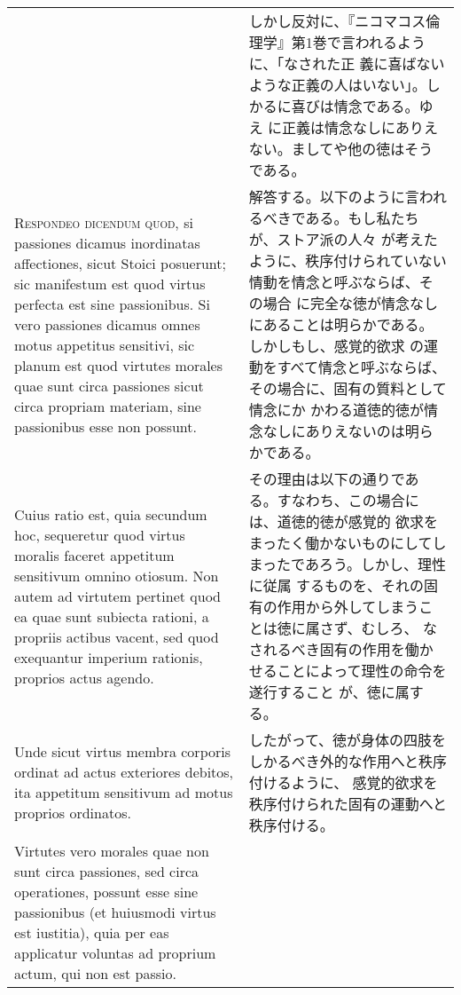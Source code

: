 \documentclass[10pt]{jsarticle}
\begin{document}
\begin{longtable}{p{21em}p{21em}}
&

 しかし反対に、『ニコマコス倫理学』第1巻で言われるように、「なされた正
 義に喜ばないような正義の人はいない」。しかるに喜びは情念である。ゆえ
 に正義は情念なしにありえない。ましてや他の徳はそうである。
 
\\




 {\scshape Respondeo dicendum quod}, si passiones dicamus inordinatas
 affectiones, sicut Stoici posuerunt; sic manifestum est quod virtus
 perfecta est sine passionibus. Si vero passiones dicamus omnes motus
 appetitus sensitivi, sic planum est quod virtutes morales quae sunt
 circa passiones sicut circa propriam materiam, sine passionibus esse
 non possunt.
 
&

 解答する。以下のように言われるべきである。もし私たちが、ストア派の人々
 が考えたように、秩序付けられていない情動を情念と呼ぶならば、その場合
 に完全な徳が情念なしにあることは明らかである。しかしもし、感覚的欲求
 の運動をすべて情念と呼ぶならば、その場合に、固有の質料として情念にか
 かわる道徳的徳が情念なしにありえないのは明らかである。
 
\\


 Cuius ratio est, quia secundum hoc, sequeretur quod virtus moralis
 faceret appetitum sensitivum omnino otiosum. Non autem ad virtutem
 pertinet quod ea quae sunt subiecta rationi, a propriis actibus
 vacent, sed quod exequantur imperium rationis, proprios actus agendo.
 
&

 その理由は以下の通りである。すなわち、この場合には、道徳的徳が感覚的
 欲求をまったく働かないものにしてしまったであろう。しかし、理性に従属
 するものを、それの固有の作用から外してしまうことは徳に属さず、むしろ、
 なされるべき固有の作用を働かせることによって理性の命令を遂行すること
 が、徳に属する。
 
\\


 Unde sicut virtus membra corporis ordinat ad actus exteriores
 debitos, ita appetitum sensitivum ad motus proprios
 ordinatos.

 &
 
 したがって、徳が身体の四肢をしかるべき外的な作用へと秩序付けるように、
 感覚的欲求を秩序付けられた固有の運動へと秩序付ける。

 \\


 Virtutes vero morales quae non sunt circa passiones, sed
 circa operationes, possunt esse sine passionibus (et huiusmodi virtus
 est iustitia), quia per eas applicatur voluntas ad proprium actum,
 qui non est passio.
 

\end{longtable}
\end{document}
